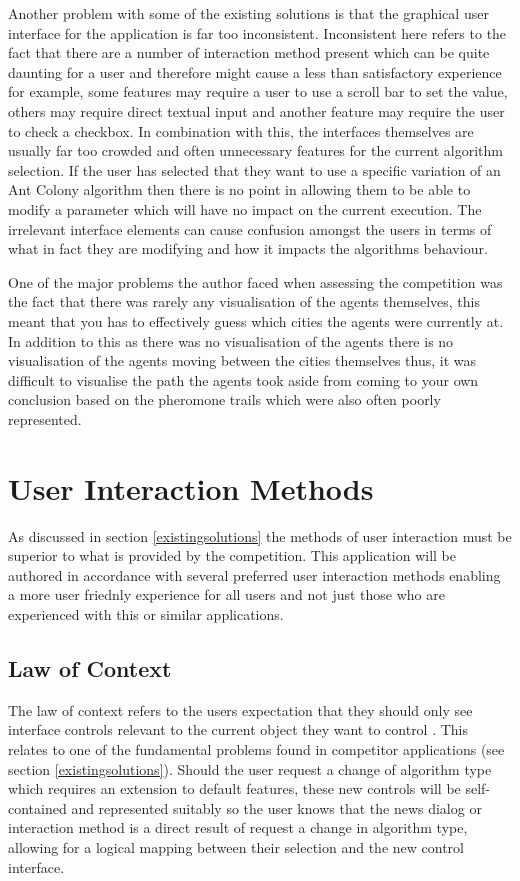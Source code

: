 Another problem with some of the existing solutions is that the graphical user interface for the application is far too inconsistent. Inconsistent here refers to the fact that there are a number of interaction method present which can be quite daunting for a user and therefore might cause a less than satisfactory experience for example, some features may require a user to use a scroll bar to set the value, others may require direct textual input and another feature may require the user to check a checkbox. In combination with this, the interfaces themselves are usually far too crowded and often unnecessary features for the current algorithm selection. If the user has selected that they want to use a specific variation of an Ant Colony algorithm then there is no point in allowing them to be able to modify a parameter which will have no impact on the current execution. The irrelevant interface elements can cause confusion amongst the users in terms of what in fact they are modifying and how it impacts the algorithms behaviour. 

One of the major problems the author faced when assessing the competition was the fact that there was rarely any visualisation of the agents themselves, this meant that you has to effectively guess which cities the agents were currently at. In addition to this as there was no visualisation of the agents there is no visualisation of the agents moving between the cities themselves thus, it was difficult to visualise the path the agents took aside from coming to your own conclusion based on the pheromone trails which were also often poorly represented.

\section{User Interaction Methods}

As discussed in section \ref{existingsolutions} the methods of user interaction must be superior to what is provided by the competition. This application will be authored in accordance with several preferred user interaction methods enabling a more user friednly experience for all users and not just those who are experienced with this or similar applications.

\subsection{Law of Context}

The law of context refers to the users expectation that they should only see interface controls relevant to the current object they want to control \cite{99designs:laws}. This relates to one of the fundamental problems found in competitor applications (see section \ref{existingsolutions}). Should the user request a change of algorithm type which requires an extension to default features, these new controls will be self-contained and represented suitably so the user knows that the news dialog or interaction method is a direct result of request a change in algorithm type, allowing for a logical mapping between their selection and the new control interface.


